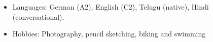 \begin{itemize}[noitemsep]
\item Languages: \hfill  German (A2), English (C2), Telugu (native), Hindi (conversational).


\item Hobbies: \hfill Photography, pencil sketching, biking and swimming

\end{itemize}


